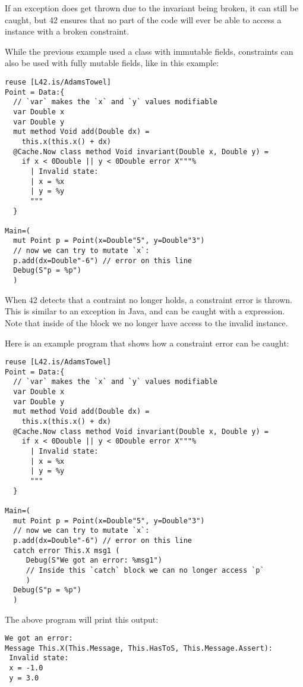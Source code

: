 If an exception does get thrown due to the invariant being broken, it can still be caught, but 42 ensures that no part of the code will ever be able to access a  instance with a broken constraint.

While the previous example used a  class with immutable fields, constraints can also be used with fully mutable fields, like in this example:

\begin{lstlisting}[caption=Constraint with mutable fields]
reuse [L42.is/AdamsTowel]
Point = Data:{
  // `var` makes the `x` and `y` values modifiable
  var Double x
  var Double y
  mut method Void add(Double dx) = 
    this.x(this.x() + dx)
  @Cache.Now class method Void invariant(Double x, Double y) = 
    if x < 0Double || y < 0Double error X"""%
      | Invalid state:
      | x = %x
      | y = %y
      """
  }

Main=(
  mut Point p = Point(x=Double"5", y=Double"3")
  // now we can try to mutate `x`:
  p.add(dx=Double"-6") // error on this line
  Debug(S"p = %p")
  )
\end{lstlisting}

When 42 detects that a contraint no longer holds, a constraint error is thrown. This is similar to an exception in Java, and can be caught with a  expression. Note that inside of the  block we no longer have access to the invalid instance.

Here is an example program that shows how a constraint error can be caught:

\begin{lstlisting}[caption=Catching a constraint error]
reuse [L42.is/AdamsTowel]
Point = Data:{
  // `var` makes the `x` and `y` values modifiable
  var Double x
  var Double y
  mut method Void add(Double dx) = 
    this.x(this.x() + dx)
  @Cache.Now class method Void invariant(Double x, Double y) = 
    if x < 0Double || y < 0Double error X"""%
      | Invalid state:
      | x = %x
      | y = %y
      """
  }

Main=(
  mut Point p = Point(x=Double"5", y=Double"3")
  // now we can try to mutate `x`:
  p.add(dx=Double"-6") // error on this line
  catch error This.X msg1 (
     Debug(S"We got an error: %msg1")
     // Inside this `catch` block we can no longer access `p`
     )
  Debug(S"p = %p")
  )
\end{lstlisting}

The above program will print this output:
\begin{lstlisting}[caption=Constraint error]
We got an error:
Message This.X(This.Message, This.HasToS, This.Message.Assert):
 Invalid state:
 x = -1.0
 y = 3.0

\end{lstlisting}

